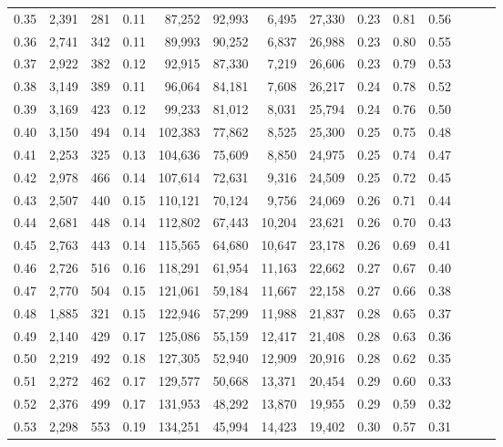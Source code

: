 \begin{tabular}{rrrrrrrrrrrrrr}
0.35 &  2,391 &  281 &  0.11 &   87,252 &   92,993 &   6,495 &  27,330 &  0.23 &  0.81 &      0.56 \\
0.36 &  2,741 &  342 &  0.11 &   89,993 &   90,252 &   6,837 &  26,988 &  0.23 &  0.80 &      0.55 \\
0.37 &  2,922 &  382 &  0.12 &   92,915 &   87,330 &   7,219 &  26,606 &  0.23 &  0.79 &      0.53 \\
0.38 &  3,149 &  389 &  0.11 &   96,064 &   84,181 &   7,608 &  26,217 &  0.24 &  0.78 &      0.52 \\
0.39 &  3,169 &  423 &  0.12 &   99,233 &   81,012 &   8,031 &  25,794 &  0.24 &  0.76 &      0.50 \\
0.40 &  3,150 &  494 &  0.14 &  102,383 &   77,862 &   8,525 &  25,300 &  0.25 &  0.75 &      0.48 \\
0.41 &  2,253 &  325 &  0.13 &  104,636 &   75,609 &   8,850 &  24,975 &  0.25 &  0.74 &      0.47 \\
0.42 &  2,978 &  466 &  0.14 &  107,614 &   72,631 &   9,316 &  24,509 &  0.25 &  0.72 &      0.45 \\
0.43 &  2,507 &  440 &  0.15 &  110,121 &   70,124 &   9,756 &  24,069 &  0.26 &  0.71 &      0.44 \\
0.44 &  2,681 &  448 &  0.14 &  112,802 &   67,443 &  10,204 &  23,621 &  0.26 &  0.70 &      0.43 \\
0.45 &  2,763 &  443 &  0.14 &  115,565 &   64,680 &  10,647 &  23,178 &  0.26 &  0.69 &      0.41 \\
0.46 &  2,726 &  516 &  0.16 &  118,291 &   61,954 &  11,163 &  22,662 &  0.27 &  0.67 &      0.40 \\
0.47 &  2,770 &  504 &  0.15 &  121,061 &   59,184 &  11,667 &  22,158 &  0.27 &  0.66 &      0.38 \\
0.48 &  1,885 &  321 &  0.15 &  122,946 &   57,299 &  11,988 &  21,837 &  0.28 &  0.65 &      0.37 \\
0.49 &  2,140 &  429 &  0.17 &  125,086 &   55,159 &  12,417 &  21,408 &  0.28 &  0.63 &      0.36 \\
0.50 &  2,219 &  492 &  0.18 &  127,305 &   52,940 &  12,909 &  20,916 &  0.28 &  0.62 &      0.35 \\
0.51 &  2,272 &  462 &  0.17 &  129,577 &   50,668 &  13,371 &  20,454 &  0.29 &  0.60 &      0.33 \\
0.52 &  2,376 &  499 &  0.17 &  131,953 &   48,292 &  13,870 &  19,955 &  0.29 &  0.59 &      0.32 \\
0.53 &  2,298 &  553 &  0.19 &  134,251 &   45,994 &  14,423 &  19,402 &  0.30 &  0.57 &      0.31 \\

\end{tabular}
